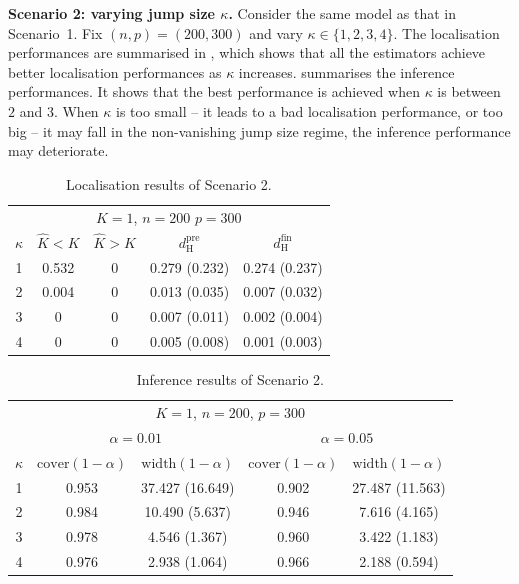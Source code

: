 \documentclass[11pt]{article}
\theoremstyle{plain}
\theoremstyle{definition}
\begin{document}
\medskip
\noindent \textbf{Scenario 2: varying jump size $\kappa$.}  Consider the same model as that in Scenario~1.  Fix $(n, p) = (200, 300)$ and vary $\kappa \in \{1, 2, 3, 4\}$. The localisation performances are summarised in , which shows that all the estimators achieve better localisation performances as $\kappa$ increases.  summarises the inference performances. It shows that the best performance is achieved when $\kappa$ is between $2$ and $3$. When $\kappa$ is too small -- it leads to a bad localisation performance, or too big -- it may fall in the non-vanishing jump size regime, the inference performance may deteriorate.
\begin{table}[htbp]
\centering
\caption{Localisation results of Scenario 2. }
\begin{tabular}{ccccc}
\hline
\multicolumn{5}{c}{$K = 1$, $n = 200$ $p = 300$} \\ 
$\kappa$   & $\widehat{K} < K$ & $\widehat{K} > K$ & $d_{\mathrm{H}}^{\mathrm{pre}}$ & $d_{\mathrm{H}}^{\mathrm{fin}}$ \\ \hline                        
1 & 0.532    & 0        & 0.279 (0.232)  & 0.274 (0.237)  \\
2 & 0.004    & 0        & 0.013 (0.035)  & 0.007 (0.032)   \\
3 & 0        & 0    & 0.007 (0.011)  & 0.002 (0.004)   \\
4 & 0        & 0    & 0.005 (0.008)  & 0.001 (0.003)   \\
\hline
\end{tabular}
\label{tab:sce2_1}
\end{table}


\begin{table}[htbp]
\centering
\caption{Inference results of Scenario 2. }
\begin{tabular}{ccccc}
\hline
\multicolumn{5}{c}{$K = 1$, $n = 200$, $p = 300$} \\
 & \multicolumn{2}{c}{$\alpha = 0.01$} & \multicolumn{2}{c}{$\alpha = 0.05$} \\
$\kappa$   & $\mathrm{cover}(1-\alpha)$ & $\mathrm{width}(1-\alpha)$ & $\mathrm{cover}(1-\alpha)$ & $\mathrm{width}(1-\alpha)$ \\ \hline
1 & 0.953            & 37.427 (16.649)  & 0.902            & 27.487 (11.563) \\
2 & 0.984            & 10.490 (5.637)  & 0.946    & 7.616 (4.165)  \\
3 & 0.978            & 4.546 (1.367)  & 0.960    & 3.422 (1.183)  \\
4 & 0.976            & 2.938 (1.064)  & 0.966    & 2.188 (0.594)  \\ \hline
\end{tabular}
\label{tab:sce2_2}
\end{table}
\end{document}
